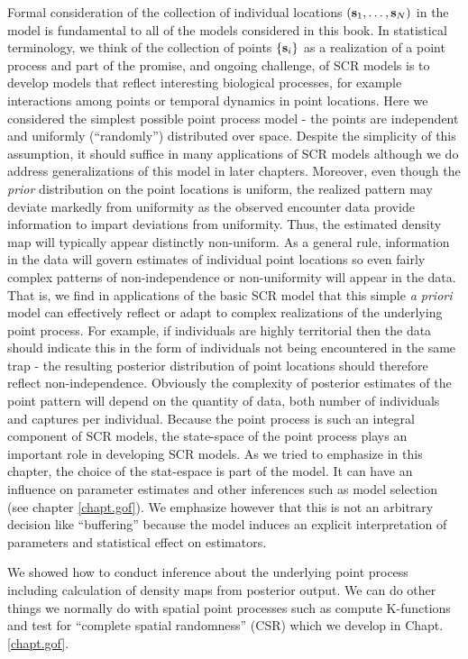 {Formal consideration of the collection of individual locations $({\bf
  s}_{1}, \ldots, {\bf s}_{N})$ in the model is fundamental to all of
the models considered in this book. In statistical terminology, we
think of the collection of points $\{ {\bf s}_{i} \}$ as a realization of a
point process and part of the promise, and ongoing challenge, of SCR
models is to develop models that reflect interesting biological
processes, for example interactions among points or temporal dynamics
in point locations.  Here we considered the simplest possible point
process model - the points are independent and uniformly
(``randomly'') distributed over space. Despite the simplicity of this
assumption, it should suffice in many applications of SCR models
although we do address generalizations of this model in later
chapters. Moreover, even though the {\it prior} distribution on the
point locations is uniform, the realized pattern may deviate markedly
from uniformity as the observed encounter data provide information to
impart deviations from uniformity. Thus, the estimated density map
will typically appear distinctly non-uniform.  As a general rule,
information in the data will govern estimates of individual point
locations so even fairly complex patterns of non-independence or
non-uniformity will appear in the data. That is, we find in
applications of the basic SCR model that this simple {\it a priori}
model can effectively reflect or adapt to complex realizations of the
underlying point process.  For example, if individuals are highly
territorial then the data should indicate this in the form of
individuals not being encountered in the same trap - the resulting
posterior distribution of point locations should therefore reflect
non-independence.  Obviously the complexity of posterior estimates of
the point pattern will depend on the quantity of data, both number of
individuals and captures per individual.  Because the point process is
such an integral component of SCR models, the state-space of the point
process plays an important role in developing SCR models. As we tried
to emphasize in this chapter, the choice of the stat-espace is part of
the model. It can have an influence on parameter estimates and other
inferences such as model selection (see chapter \ref{chapt.gof}). We
emphasize however that this is not an arbitrary decision like
``buffering'' because the model induces an explicit interpretation of
parameters and statistical effect on estimators.

We showed how to conduct inference about the underlying point process
including calculation of density maps from posterior output. We can do
other things we normally do with spatial point processes such as
compute K-functions and test for ``complete spatial randomness''
(CSR) which we develop in Chapt.  \ref{chapt.gof}. 


}
